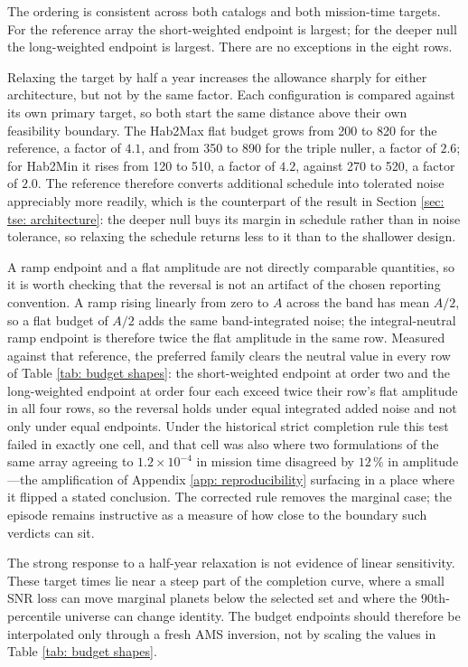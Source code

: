 \documentclass[12pt,a4paper]{article}
\numberwithin{equation}{section}
\numberwithin{figure}{section}
\numberwithin{table}{section}
\begin{document}
The ordering is consistent across both catalogs and both mission-time targets. For the reference array the short-weighted endpoint is largest; for the deeper null the long-weighted endpoint is largest. There are no exceptions in the eight rows.

Relaxing the target by half a year increases the allowance sharply for either architecture, but not by the same factor. Each configuration is compared against its own primary target, so both start the same distance above their own feasibility boundary. The Hab2Max flat budget grows from 200 to 820 for the reference, a factor of $4.1$, and from 350 to 890 for the triple nuller, a factor of $2.6$; for Hab2Min it rises from 120 to 510, a factor of $4.2$, against 270 to 520, a factor of $2.0$. The reference therefore converts additional schedule into tolerated noise appreciably more readily, which is the counterpart of the result in Section \ref{sec: tse: architecture}: the deeper null buys its margin in schedule rather than in noise tolerance, so relaxing the schedule returns less to it than to the shallower design.

A ramp endpoint and a flat amplitude are not directly comparable quantities, so it is worth checking that the reversal is not an artifact of the chosen reporting convention. A ramp rising linearly from zero to $A$ across the band has mean $A/2$, so a flat budget of $A/2$ adds the same band-integrated noise; the integral-neutral ramp endpoint is therefore twice the flat amplitude in the same row. Measured against that reference, the preferred family clears the neutral value in every row of Table \ref{tab: budget shapes}: the short-weighted endpoint at order two and the long-weighted endpoint at order four each exceed twice their row's flat amplitude in all four rows, so the reversal holds under equal integrated added noise and not only under equal endpoints. Under the historical strict completion rule this test failed in exactly one cell, and that cell was also where two formulations of the same array agreeing to $1.2\times10^{-4}$ in mission time disagreed by $12\,\%$ in amplitude---the amplification of Appendix \ref{app: reproducibility} surfacing in a place where it flipped a stated conclusion. The corrected rule removes the marginal case; the episode remains instructive as a measure of how close to the boundary such verdicts can sit.

The strong response to a half-year relaxation is not evidence of linear sensitivity. These target times lie near a steep part of the completion curve, where a small SNR loss can move marginal planets below the selected set and where the 90th-percentile universe can change identity. The budget endpoints should therefore be interpolated only through a fresh AMS inversion, not by scaling the values in Table \ref{tab: budget shapes}.
\end{document}
